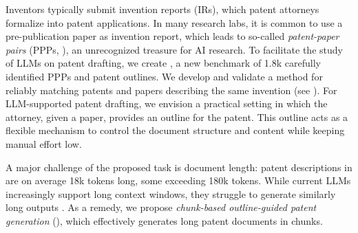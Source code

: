 Inventors typically submit invention reports (IRs), which patent attorneys formalize into patent applications.
In many research labs, it is common to use a pre-publication paper as invention report, which leads to so-called \textit{patent-paper pairs} (PPPs, \citet{murrayInnovationCoevolutionScientific2002}), an unrecognized treasure for AI research. %
To facilitate the study of LLMs on patent drafting, we create \DatasetName, a new benchmark of 1.8k carefully identified PPPs and patent outlines.
We develop and validate a method for reliably matching patents and papers describing the same invention (see ).
For LLM-supported patent drafting, we envision a practical setting in which the attorney, given a paper, %
provides an outline for the patent.
This outline acts as a flexible mechanism to control the document structure and content while keeping manual effort low.

A major challenge of the proposed task is document length: patent descriptions in \DatasetName are on average 18k tokens long, some exceeding 180k tokens.
While current LLMs increasingly support long context windows, they struggle to generate similarly long outputs \cite{liuLongGenBenchLongcontextGeneration2024,baiLongWriterUnleashing102024,wuLongGenBenchBenchmarkingLongForm2025,yeLongProcBenchmarkingLongContext2025}.
As a remedy, we propose \textit{chunk-based outline-guided patent generation} (\MethodName), which effectively generates long patent documents in chunks.

